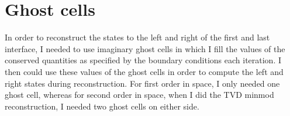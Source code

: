 \section{Ghost cells}
In order to reconstruct the states to the left and right of the first and last interface, I needed to use imaginary ghost cells in which I fill the values of the conserved quantities as specified by the boundary conditions each iteration. I then could use these values of the ghost cells in order to compute the left and right states during reconstruction. For first order in space, I only needed one ghost cell, whereas for second order in space, when I did the TVD minmod reconstruction, I needed two ghost cells on either side.
